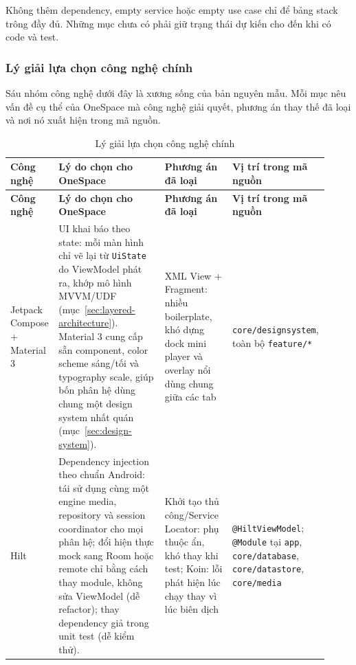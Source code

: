 Không thêm dependency, empty service hoặc empty use case chỉ để bảng stack trông đầy đủ. Những mục chưa có phải giữ trạng thái dự kiến cho đến khi có code và test.

\subsubsection{Lý giải lựa chọn công nghệ chính}
\label{sec:tech-rationale}

Sáu nhóm công nghệ dưới đây là xương sống của bản nguyên mẫu. Mỗi mục nêu vấn đề cụ thể của OneSpace mà công nghệ giải quyết, phương án thay thế đã loại và nơi nó xuất hiện trong mã nguồn.

\begingroup
\small
\renewcommand{\arraystretch}{1.2}
\setlength{\tabcolsep}{3pt}
\begin{longtable}{>{\RaggedRight\arraybackslash}p{0.15\linewidth}>{\RaggedRight\arraybackslash}p{0.33\linewidth}>{\RaggedRight\arraybackslash}p{0.21\linewidth}>{\RaggedRight\arraybackslash}p{0.23\linewidth}}
\caption{Lý giải lựa chọn công nghệ chính}
\label{tab:tech-rationale}\\
\toprule
\textbf{Công nghệ} & \textbf{Lý do chọn cho OneSpace} & \textbf{Phương án đã loại} & \textbf{Vị trí trong mã nguồn} \\
\midrule
\endfirsthead
\toprule
\textbf{Công nghệ} & \textbf{Lý do chọn cho OneSpace} & \textbf{Phương án đã loại} & \textbf{Vị trí trong mã nguồn} \\
\midrule
\endhead
\bottomrule
\endfoot
Jetpack Compose + Material 3 & UI khai báo theo state: mỗi màn hình chỉ vẽ lại từ \texttt{UiState} do ViewModel phát ra, khớp mô hình MVVM/UDF (mục~\ref{sec:layered-architecture}). Material 3 cung cấp sẵn component, color scheme sáng/tối và typography scale, giúp bốn phân hệ dùng chung một design system nhất quán (mục~\ref{sec:design-system}). & XML View + Fragment: nhiều boilerplate, khó dựng dock mini player và overlay nổi dùng chung giữa các tab & \texttt{core/designsystem}, toàn bộ \texttt{feature/*} \\
Hilt & Dependency injection theo chuẩn Android: tái sử dụng cùng một engine media, repository và session coordinator cho mọi phân hệ; đổi hiện thực mock sang Room hoặc remote chỉ bằng cách thay module, không sửa ViewModel (dễ refactor); thay dependency giả trong unit test (dễ kiểm thử). & Khởi tạo thủ công/Service Locator: phụ thuộc ẩn, khó thay khi test; Koin: lỗi phát hiện lúc chạy thay vì lúc biên dịch & 16 \texttt{@HiltViewModel}; \texttt{@Module} tại \texttt{app}, \texttt{core/database}, \texttt{core/datastore}, \texttt{core/media} \\

\end{longtable}
